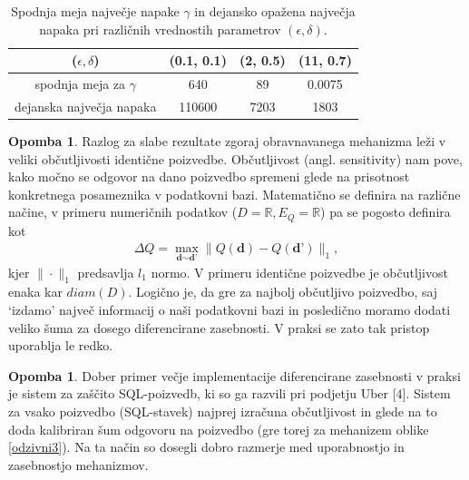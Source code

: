 \documentclass[12pt,a4paper]{amsart}
\theoremstyle{definition} %
\newtheorem{opomba}[definicija]{Opomba}
\theoremstyle{plain} %
\begin{document}
\begin{table}[h]
\begin{center}
 \begin{tabular}{| c | c | c | c |} 
 \hline
($\epsilon, \delta$) & (0.1, 0.1) & (2, 0.5) & (11, 0.7)  \\ [0.5ex] 
 \hline
 spodnja meja za $\gamma$ & 640 & 89 & 0.0075  \\ 
 \hline
 dejanska največja napaka & 110600 & 7203 & 1803\\
 \hline
\end{tabular}
\caption{Spodnja meja največje napake $\gamma$ in dejansko opažena največja napaka pri različnih vrednostih parametrov $(\epsilon, \delta)$. }
\end{center}
\end{table}
\begin{opomba}
Razlog za slabe rezultate zgoraj obravnavanega mehanizma leži v veliki občutljivosti identične poizvedbe. Občutljivost (angl. sensitivity) nam pove, kako močno se odgovor na dano poizvedbo spremeni glede na prisotnost konkretnega posameznika v podatkovni bazi. Matematično se definira na različne načine, v primeru numeričnih podatkov ($D = \mathbb{R}, E_Q = \mathbb{R}$) pa se pogosto definira kot
\begin{gather*}
\Delta Q = \max_{\textbf{d} \sim \textbf{d'}} \| Q(\textbf{d}) - Q(\textbf{d'}) \|_1 ,
\end{gather*}
kjer $\| \cdot \|_1$ predsavlja $l_1$ normo. V primeru identične poizvedbe je občutljivost enaka kar $diam(D)$. Logično je, da gre za najbolj občutljivo poizvedbo, saj `izdamo' največ informacij o naši podatkovni bazi in posledično moramo dodati veliko šuma za dosego diferencirane zasebnosti. V praksi se zato tak pristop uporablja le redko.
\end{opomba}
\begin{opomba}
Dober primer večje implementacije diferencirane zasebnosti v praksi je sistem za zaščito SQL-poizvedb, ki so ga razvili pri podjetju Uber [4]. Sistem za vsako poizvedbo (SQL-stavek) najprej izračuna občutljivost in glede na to doda kalibriran šum odgovoru na poizvedbo (gre torej za mehanizem oblike \eqref{odzivni3}). Na ta način so dosegli dobro razmerje med uporabnostjo in zasebnostjo mehanizmov.
\end{opomba}
\end{document}
